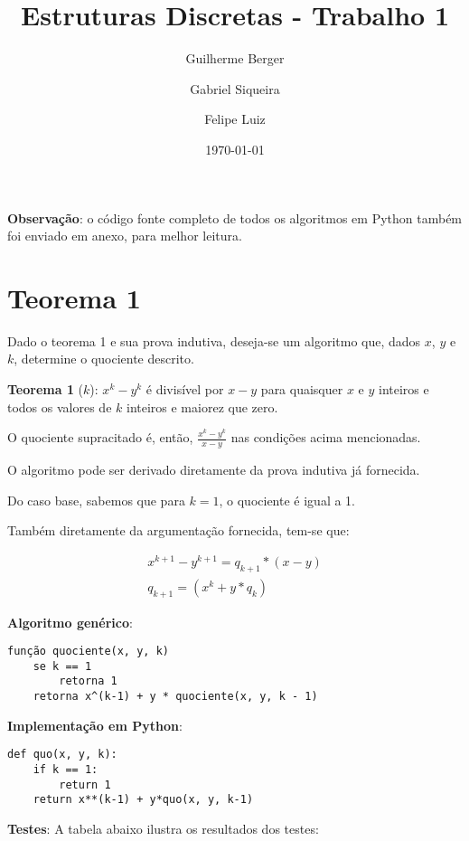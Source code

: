 \documentclass{article}
\title{Estruturas Discretas - Trabalho 1}
\author{Guilherme Berger \and Gabriel Siqueira \and Felipe Luiz}
\date{\today}
\begin{document}
\maketitle

\textbf{Observação}: o código fonte completo de todos os algoritmos em Python também foi enviado em anexo, para melhor leitura.

\section{Teorema 1}

Dado o teorema 1 e sua prova indutiva, deseja-se um algoritmo que, dados $x$, $y$ e $k$, determine o quociente descrito.

\textbf{Teorema 1} ($k$): $x^k - y^k$ é divisível por $x-y$ para quaisquer $x$ e $y$ inteiros e todos os valores de $k$ inteiros e maiorez que zero.

O quociente supracitado é, então, $\frac{x^k - y^k}{x-y}$ nas condições acima mencionadas.

O algoritmo pode ser derivado diretamente da prova indutiva já fornecida.

Do caso base, sabemos que para $k = 1$, o quociente é igual a 1.

Também diretamente da argumentação fornecida, tem-se que:

\begin{gather}
x^{k+1} - y^{k+1} = q_{k+1} * (x - y) \\
q_{k+1} = (x^k + y * q_k)
\end{gather}

\textbf{Algoritmo genérico}:

{\color{ogreen}
\begin{verbatim}
função quociente(x, y, k)
    se k == 1
        retorna 1
    retorna x^(k-1) + y * quociente(x, y, k - 1)
\end{verbatim}
}

\textbf{Implementação em Python}:

{\color{red}
\begin{verbatim}
def quo(x, y, k):
    if k == 1:
        return 1
    return x**(k-1) + y*quo(x, y, k-1)
\end{verbatim}
}

\textbf{Testes}: A tabela abaixo ilustra os resultados dos testes:
\end{document}
